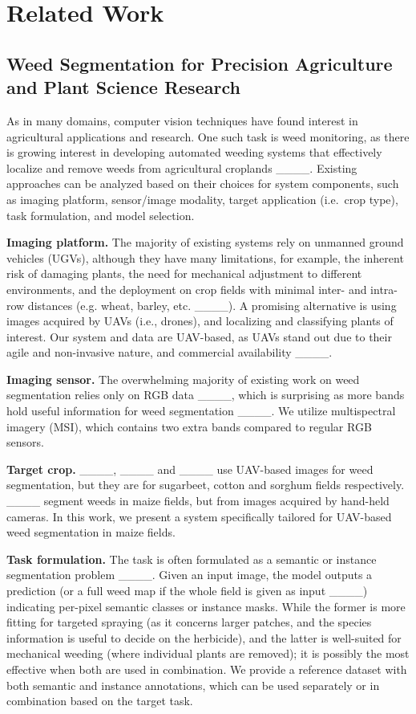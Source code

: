 \section{Related Work}
\label{sec:related_work}

\subsection{Weed Segmentation for Precision Agriculture and Plant Science Research}

As in many domains, computer vision techniques have found interest in agricultural applications and research. One such task is weed monitoring, as there is growing interest in developing automated weeding systems that effectively localize and remove weeds from agricultural croplands ____.
Existing approaches can be analyzed based on their choices for system components, such as imaging platform, sensor/image modality, target application (i.e.~crop type), task formulation, and model selection.  

\noindent \textbf{Imaging platform.}
The majority of existing systems rely on unmanned ground vehicles (UGVs), although they have many limitations,
for example, the inherent risk of damaging plants, the need for mechanical adjustment to different environments, and the deployment on crop fields with minimal inter- and intra-row distances (e.g. wheat, barley, etc. ____).
A promising alternative is using images acquired by UAVs (i.e., drones), and localizing and classifying plants of interest.
Our system and data are UAV-based, as UAVs stand out due to their agile and non-invasive nature, and commercial availability ____.


\noindent \textbf{Imaging sensor.} The overwhelming majority of existing work on weed segmentation relies only on RGB data ____, which is surprising as more bands hold useful information for weed segmentation ____. We utilize multispectral imagery (MSI), which contains two extra bands compared to regular RGB sensors. 

\noindent \textbf{Target crop.} ____, ____ and ____ use UAV-based images for weed segmentation, but they are for sugarbeet, cotton and sorghum fields respectively. ____ segment weeds in maize fields, but from images acquired by hand-held cameras. In this work, we present a system specifically tailored for UAV-based weed segmentation in maize fields.

\noindent \textbf{Task formulation.} The task is often formulated as a semantic or instance segmentation problem ____.
Given an input image, the model outputs a prediction (or a full weed map if the whole field is given as input ____) indicating per-pixel semantic classes or instance masks.
While the former is more fitting for targeted spraying (as it concerns larger patches, and the species information is useful to decide on the herbicide), and the latter is well-suited for mechanical weeding (where individual plants are removed); it is possibly the most effective when both are used in combination. We provide a reference dataset with both semantic and instance annotations, which can be used separately or in combination based on the target task.


